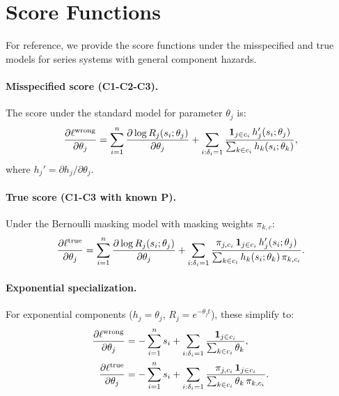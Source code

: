 \section{Score Functions}
\label{app:scores}

For reference, we provide the score functions under the misspecified and true
models for series systems with general component hazards.

\paragraph{Misspecified score (C1-C2-C3).}
The score under the standard model for parameter $\theta_j$ is:
\begin{equation}
    \frac{\partial \ell^{\mathrm{wrong}}}{\partial \theta_j} =
    \sum_{i=1}^n \frac{\partial \log R_j(s_i; \theta_j)}{\partial \theta_j}
    + \sum_{i: \delta_i = 1}
    \frac{\mathbf{1}_{j \in c_i}\, h_j'(s_i; \theta_j)}{\sum_{k \in c_i} h_k(s_i; \theta_k)},
\end{equation}
where $h_j' = \partial h_j / \partial \theta_j$.

\paragraph{True score (C1-C3 with known $\mathbf{P}$).}
Under the Bernoulli masking model with masking weights $\pi_{k,c}$:
\begin{equation}
    \frac{\partial \ell^{\mathrm{true}}}{\partial \theta_j} =
    \sum_{i=1}^n \frac{\partial \log R_j(s_i; \theta_j)}{\partial \theta_j}
    + \sum_{i: \delta_i = 1}
    \frac{\pi_{j,c_i}\,\mathbf{1}_{j \in c_i}\, h_j'(s_i; \theta_j)}
         {\sum_{k \in c_i} h_k(s_i; \theta_k)\,\pi_{k,c_i}}.
\end{equation}

\paragraph{Exponential specialization.}
For exponential components ($h_j = \theta_j$, $R_j = e^{-\theta_j t}$), these
simplify to:
\begin{align}
    \frac{\partial \ell^{\mathrm{wrong}}}{\partial \theta_j}
    &= -\sum_{i=1}^n s_i + \sum_{i: \delta_i = 1}
        \frac{\mathbf{1}_{j \in c_i}}{\sum_{k \in c_i} \theta_k}, \\
    \frac{\partial \ell^{\mathrm{true}}}{\partial \theta_j}
    &= -\sum_{i=1}^n s_i + \sum_{i: \delta_i = 1}
        \frac{\pi_{j,c_i}\,\mathbf{1}_{j \in c_i}}
             {\sum_{k \in c_i} \theta_k\,\pi_{k,c_i}}.
\end{align}

